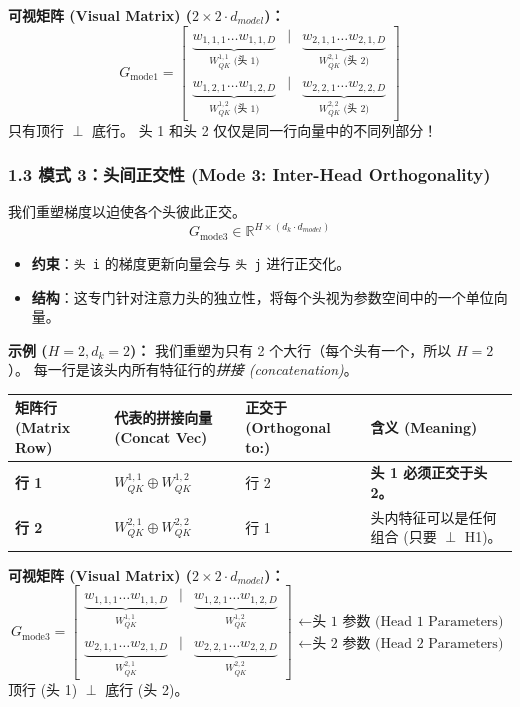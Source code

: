 \documentclass[12pt]{article}
\begin{document}
\textbf{可视矩阵 (Visual Matrix) ($2 \times 2 \cdot d_{model}$)：}
$$
G_{\text{mode1}} = 
\begin{bmatrix}
\underbrace{w_{1,1,1} \dots w_{1,1,D}}_{W_{QK}^{1,1} \text{ (头 1)}} & \mathbf{|} & \underbrace{w_{2,1,1} \dots w_{2,1,D}}_{W_{QK}^{2,1} \text{ (头 2)}} \\
\underbrace{w_{1,2,1} \dots w_{1,2,D}}_{W_{QK}^{1,2} \text{ (头 1)}} & \mathbf{|} & \underbrace{w_{2,2,1} \dots w_{2,2,D}}_{W_{QK}^{2,2} \text{ (头 2)}}
\end{bmatrix}
$$
只有顶行 $\perp$ 底行。 头 1 和头 2 仅仅是同一行向量中的不同列部分！

\subsubsection*{1.3 模式 3：头间正交性 (Mode 3: Inter-Head Orthogonality)}
我们重塑梯度以迫使各个头彼此正交。
$$G_{\text{mode3}} \in \mathbb{R}^{H \times (d_k \cdot d_{model})}$$
\begin{itemize}
    \item \textbf{约束}：\texttt{头 i} 的梯度更新向量会与 \texttt{头 j} 进行正交化。
    \item \textbf{结构}：这专门针对注意力头的独立性，将每个头视为参数空间中的一个单位向量。
\end{itemize}

\textbf{示例 ($H=2, d_k=2$)：}
我们重塑为只有 2 个大行（每个头有一个，所以 $H=2$）。 每一行是该头内所有特征行的\textit{拼接 (concatenation)}。

\begin{table}[h]
\centering
\color{lighttext}
\begin{tabularx}{\textwidth}{l X X X}
\toprule
矩阵行 (Matrix Row) & 代表的拼接向量 (Concat Vec) & 正交于 (Orthogonal to:) & 含义 (Meaning) \\
\midrule
\textbf{行 1} & $W_{QK}^{1,1} \oplus W_{QK}^{1,2}$ & 行 2 & \textbf{头 1 必须正交于头 2。} \\
\textbf{行 2} & $W_{QK}^{2,1} \oplus W_{QK}^{2,2}$ & 行 1 & 头内特征可以是任何组合 (只要 $\perp$ H1)。 \\
\bottomrule
\end{tabularx}
\end{table}

\textbf{可视矩阵 (Visual Matrix) ($2 \times 2 \cdot d_{model}$)：}
$$
G_{\text{mode3}} = 
\begin{bmatrix}
\underbrace{w_{1,1,1} \dots w_{1,1,D}}_{W_{QK}^{1,1}} & \mathbf{|} & \underbrace{w_{1,2,1} \dots w_{1,2,D}}_{W_{QK}^{1,2}} \\
\underbrace{w_{2,1,1} \dots w_{2,1,D}}_{W_{QK}^{2,1}} & \mathbf{|} & \underbrace{w_{2,2,1} \dots w_{2,2,D}}_{W_{QK}^{2,2}}
\end{bmatrix}
\begin{matrix}
\leftarrow \text{头 1 参数 (Head 1 Parameters)} \\
\leftarrow \text{头 2 参数 (Head 2 Parameters)}
\end{matrix}
$$
顶行 (头 1) $\perp$ 底行 (头 2)。
\end{document}
